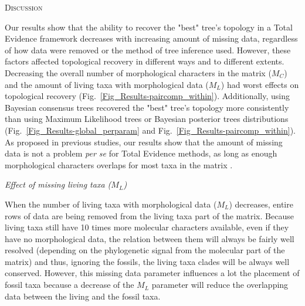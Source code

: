 \documentclass[12pt,letterpaper]{article}
\renewcommand{\section}[1]{%
\bigskip
\begin{center}
\begin{Large}
\normalfont\scshape #1
\medskip
\end{Large}
\end{center}}
\renewcommand{\subsection}[1]{%
\bigskip
\begin{center}
\begin{large}
\normalfont\itshape #1
\end{large}
\end{center}}
\begin{document}
\section{Discussion}

Our results show that the ability to recover the "best" tree's topology in a Total Evidence framework decreases with increasing amount of missing data, regardless of how data were removed or the method of tree inference used. However, these factors affected topological recovery in different ways and to different extents. 
Decreasing the overall number of morphological characters in the matrix ($M_{C}$) and the amount of living taxa with morphological data ($M_{L}$) had worst effects on topological recovery (Fig.~\ref{Fig_Results-paircomp_within}). Additionally, using Bayesian consensus trees recovered the "best" tree's topology more consistently than using Maximum Likelihood trees or Bayesian posterior trees distributions (Fig.~\ref{Fig_Results-global_perparam} and Fig.~\ref{Fig_Results-paircomp_within}).
As proposed in previous studies, our results show that the amount of missing data is not a problem \textit{per se} for Total Evidence methods, as long as enough morphological characters overlaps for most taxa in the matrix \citep[e.g.][]{kearneyfragmentary2002,wiensmissing2003,rouresite-specific2011,pattinsonphylogeny2014}. %

\subsection{Effect of missing living taxa ($M_{L}$)} %
When the number of living taxa with morphological data ($M_{L}$) decreases, entire rows of data are being removed from the living taxa part of the matrix. Because living taxa still have 10 times more molecular characters available, even if they have no morphological data, the relation between them will always be fairly well resolved (depending on the phylogenetic signal from the molecular part of the matrix) and thus, ignoring the fossils, the living taxa clades will be always well conserved. However, this missing data parameter influences a lot the placement of fossil taxa because a decrease of the $M_{L}$ parameter will reduce the overlapping data between the living and the fossil taxa.
\end{document}
